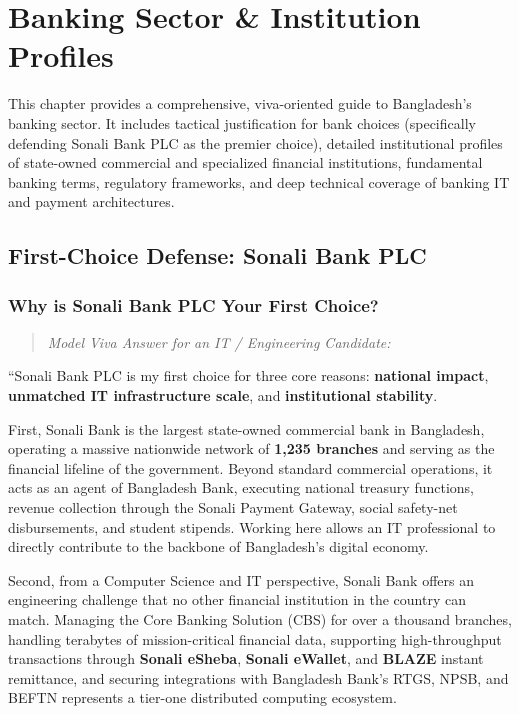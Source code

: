 \chapter{Banking Sector \& Institution Profiles}
\label{ch:banking}

This chapter provides a comprehensive, viva-oriented guide to Bangladesh's banking sector. It includes tactical justification for bank choices (specifically defending Sonali Bank PLC as the premier choice), detailed institutional profiles of state-owned commercial and specialized financial institutions, fundamental banking terms, regulatory frameworks, and deep technical coverage of banking IT and payment architectures.

\medskip

\section{First-Choice Defense: Sonali Bank PLC}

\subsection{Why is Sonali Bank PLC Your First Choice?}

\begin{quote}
\textit{Model Viva Answer for an IT / Engineering Candidate:}
\end{quote}

``Sonali Bank PLC is my first choice for three core reasons: \textbf{national impact}, \textbf{unmatched IT infrastructure scale}, and \textbf{institutional stability}.

First, Sonali Bank is the largest state-owned commercial bank in Bangladesh, operating a massive nationwide network of \textbf{1,235 branches} and serving as the financial lifeline of the government. Beyond standard commercial operations, it acts as an agent of Bangladesh Bank, executing national treasury functions, revenue collection through the Sonali Payment Gateway, social safety-net disbursements, and student stipends. Working here allows an IT professional to directly contribute to the backbone of Bangladesh's digital economy.

Second, from a Computer Science and IT perspective, Sonali Bank offers an engineering challenge that no other financial institution in the country can match. Managing the Core Banking Solution (CBS) for over a thousand branches, handling terabytes of mission-critical financial data, supporting high-throughput transactions through \textbf{Sonali eSheba}, \textbf{Sonali eWallet}, and \textbf{BLAZE} instant remittance, and securing integrations with Bangladesh Bank's RTGS, NPSB, and BEFTN represents a tier-one distributed computing ecosystem.

